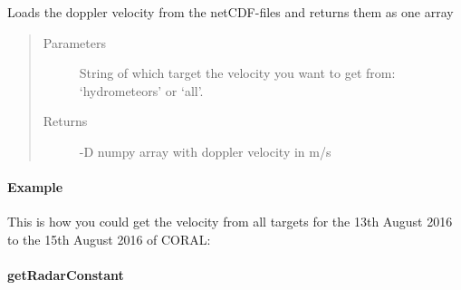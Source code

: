 \documentclass[letterpaper,10pt,english]{sphinxmanual}
\begin{document}
\begin{fulllineitems}
\begin{fulllineitems}
\label{\detokenize{generated/MPPy.Instruments.Radar.Radar.getVelocity:MPPy.Instruments.Radar.Radar.getVelocity}}
Loads the doppler velocity from the netCDF-files and returns them as one array
\begin{quote}\begin{description}
\item[{Parameters}] \leavevmode
{} \textendash{} String of which target the velocity you want to get from: ‘hydrometeors’ or ‘all’.

\item[{Returns}] -D numpy array with doppler velocity in m/s

\end{description}\end{quote}
\paragraph{Example}

This is how you could get the velocity from all targets for the 13th August 2016 to the 15th August 2016
of CORAL:

\begin{sphinxVerbatim}[commandchars=\\\{\}]
   
  
\end{sphinxVerbatim}

\end{fulllineitems}



\paragraph{getRadarConstant}
\label{\detokenize{generated/MPPy.Instruments.Radar.Radar.getRadarConstant:getradarconstant}}\label{\detokenize{generated/MPPy.Instruments.Radar.Radar.getRadarConstant::doc}}


\end{fulllineitems}
\end{document}
